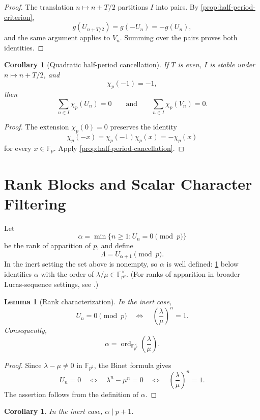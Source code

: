 \documentclass[11pt]{article}
\newcommand{\ord}{\operatorname{ord}}
\newcommand{\Fp}{\mathbb{F}_p}
\newcommand{\Fpq}{\mathbb{F}_{p^2}}
\newcommand{\chiP}{\chi_p}
\theoremstyle{plain}
\newtheorem{lemma}[theorem]{Lemma}
\newtheorem{corollary}[theorem]{Corollary}
\theoremstyle{definition}
\begin{document}
\begin{proof}
The translation $n\mapsto n+T/2$ partitions $I$ into pairs. By \cref{prop:half-period-criterion},
\[
 g(U_{n+T/2})=g(-U_n)=-g(U_n),
\]
and the same argument applies to $V_n$. Summing over the pairs proves both identities.
\end{proof}

\begin{corollary}[Quadratic half-period cancellation]
\label{cor:quadratic-half-period}
If $T$ is even, $I$ is stable under $n\mapsto n+T/2$, and
\[
 \chiP(-1)=-1,
\]
then
\[
 \sum_{n\in I}\chiP(U_n)=0
 \qquad\text{and}\qquad
 \sum_{n\in I}\chiP(V_n)=0.
\]
\end{corollary}

\begin{proof}
The extension $\chiP(0)=0$ preserves the identity
\[
 \chiP(-x)=\chiP(-1)\chiP(x)=-\chiP(x)
\]
for every $x\in\Fp$. Apply \cref{prop:half-period-cancellation}.
\end{proof}

\section{Rank Blocks and Scalar Character Filtering}

Let
\[
 \alpha=\min\{n\geq1:U_n=0\pmod p\}
\]
be the rank of apparition of $p$, and define
\[
 \Lambda=U_{\alpha+1}\pmod p.
\]
In the inert setting the set above is nonempty, so $\alpha$ is well defined: \cref{lem:rank-characterization} below identifies $\alpha$ with the order of $\lambda/\mu\in\Fpq^\times$. (For ranks of apparition in broader Lucas-sequence settings, see \cite{Desmond1978,Somer1980,Sanna2022,Sanna2024}.)

\begin{lemma}[Rank characterization]
\label{lem:rank-characterization}
In the inert case,
\[
 U_n=0\pmod p
 \quad\Longleftrightarrow\quad
 \left(\frac{\lambda}{\mu}\right)^n=1.
\]
Consequently,
\[
 \alpha=\ord_{\Fpq^\times}\left(\frac{\lambda}{\mu}\right).
\]
\end{lemma}

\begin{proof}
Since $\lambda-\mu\neq0$ in $\Fpq$, the Binet formula gives
\[
 U_n=0
 \quad\Longleftrightarrow\quad
 \lambda^n-\mu^n=0
 \quad\Longleftrightarrow\quad
 \left(\frac{\lambda}{\mu}\right)^n=1.
\]
The assertion follows from the definition of $\alpha$.
\end{proof}

\begin{corollary}
\label{cor:alpha-divides-p-plus-1}
In the inert case, $\alpha\mid p+1$.
\end{corollary}
\end{document}
